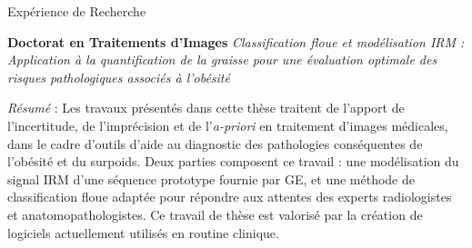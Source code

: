 \begin{rubric}{Expérience de Recherche}
    
  \entry*[2004--2008]
   \textbf{Doctorat en Traitements d'Images}
  \textit{Classification floue et modélisation IRM : Application à la quantification de la graisse pour une évaluation optimale des risques pathologiques associés à l'obésité}\newline
  
  \textit{Résumé} : Les travaux présentés dans cette thèse traitent de
  l'apport de l'incertitude, de l'imprécision et de l'\emph{a-priori}
  en traitement d'images médicales, dans le cadre d'outils d’aide au
  diagnostic des pathologies conséquentes de l'obésité et du
  surpoids. Deux parties composent ce travail : une modélisation du
  signal IRM d’une séquence prototype fournie par GE, et une méthode
  de classification floue adaptée pour répondre aux attentes des
  experts radiologistes et anatomopathologistes. Ce travail de thèse
  est valorisé par la création de logiciels actuellement utilisés en
  routine clinique.\newline


\end{rubric}
